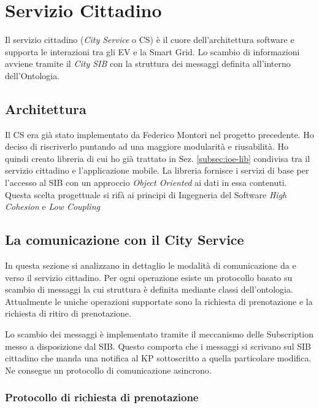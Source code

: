 \chapter{Servizio Cittadino}

Il servizio cittadino (\emph{City Service} o CS) è il cuore dell'architettura software e supporta le interazioni tra gli EV e la Smart Grid. Lo scambio di informazioni avviene tramite il \emph{City SIB} con la struttura dei messaggi definita all'interno dell'Ontologia. 

\section{Architettura}

Il CS era già stato implementato da Federico Montori nel progetto precedente. Ho deciso di riscriverlo puntando ad una maggiore modularità e riusabilità. Ho quindi creato libreria di cui ho già trattato in Sez. \ref{subsec:ioe-lib} condivisa tra il servizio cittadino e l'applicazione mobile. La libreria fornisce i servizi di base per l'accesso al SIB con un approccio \emph{Object Oriented} ai dati in essa contenuti. Questa scelta progettuale si rifà ai principi di Ingegneria del Software \emph{High Cohesion} e \emph{Low Coupling} \cite{larcab2005}

\section{La comunicazione con il City Service}\label{sec:protocol}

In questa sezione si analizzano in dettaglio le modalità di comunicazione da e verso il servizio cittadino. Per ogni operazione esiste un protocollo basato su scambio di messaggi la cui struttura è definita mediante classi dell'ontologia. Attualmente le uniche operazioni supportate sono la richiesta di prenotazione e la richiesta di ritiro di prenotazione.

Lo scambio dei messaggi è implementato tramite il meccanismo delle Subscription messo a disposizione dal SIB. Questo comporta che i messaggi si scrivano sul SIB cittadino che manda una notifica al KP sottoscritto a quella particolare modifica. Ne consegue un protocollo di comunicazione asincrono.

\subsection{Protocollo di richiesta di prenotazione}


